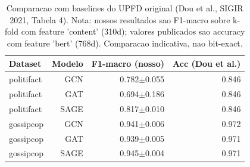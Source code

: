 \begin{table}[H]\centering
\caption{Comparacao com baselines do UPFD original (Dou et al., SIGIR 2021, Tabela 4). Nota: nossos resultados sao F1-macro sobre k-fold com feature 'content' (310d); valores publicados sao accuracy com feature 'bert' (768d). Comparacao indicativa, nao bit-exact.}
\label{tab:upfd_vs_publicado}
\begin{tabular}{lrrr}
\toprule
Dataset & Modelo & F1-macro (nosso) & Acc (Dou et al.) \\
\midrule
politifact & GCN & 0.782$\pm$0.055 & 0.846 \\
politifact & GAT & 0.694$\pm$0.186 & 0.846 \\
politifact & SAGE & 0.817$\pm$0.010 & 0.846 \\
gossipcop & GCN & 0.941$\pm$0.006 & 0.972 \\
gossipcop & GAT & 0.939$\pm$0.005 & 0.971 \\
gossipcop & SAGE & 0.945$\pm$0.004 & 0.971 \\
\bottomrule
\end{tabular}
\end{table}